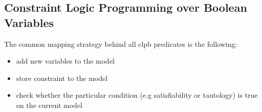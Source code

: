 \subsection{Constraint Logic Programming over Boolean Variables}\label{subsec:map_clpb}
The common mapping strategy behind all clpb predicates is the following:
\begin{itemize}
    \item add new variables to the model
    \item store constraint to the model
    \item check whether the particular condition (e.g satisfiability or tautology) is true on the current model
\end{itemize}






